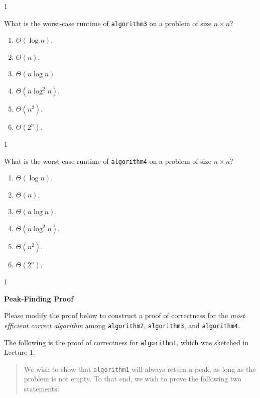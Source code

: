 \documentclass[12pt,twoside]{article}
\begin{document}
\begin{exercises}
\begin{problemparts}
\ifsolution \solution{}
1
\fi

\problempart {} What is the worst-case runtime of \texttt{algorithm3} on a problem of size $n \times n$?
\begin{enumerate}
\item $\Theta(\log n)$.
\item $\Theta(n)$.
\item $\Theta(n \log n)$.
\item $\Theta(n \log^2 n)$.
\item $\Theta(n^2)$.
\item $\Theta(2^n)$.
\end{enumerate}

\ifsolution \solution{}
1
\fi

\problempart {} What is the worst-case runtime of \texttt{algorithm4} on a problem of size $n \times n$?
\begin{enumerate}
\item $\Theta(\log n)$.
\item $\Theta(n)$.
\item $\Theta(n \log n)$.
\item $\Theta(n \log^2 n)$.
\item $\Theta(n^2)$.
\item $\Theta(2^n)$.
\end{enumerate}

\ifsolution \solution{}
1
\fi

\end{problemparts}

\problem {} \textbf{Peak-Finding Proof}

Please modify the proof below to construct a proof of correctness
for the \emph{most efficient correct algorithm}
among \texttt{algorithm2}, \texttt{algorithm3}, and \texttt{algorithm4}.

The following is the proof of correctness
for \texttt{algorithm1},
which was sketched in Lecture 1.

\begin{quote}
We wish to show that \texttt{algorithm1}
will always return a peak,
as long as the problem is not empty.
To that end,
we wish to prove the following two statements:


\end{quote}
\end{exercises}
\end{document}

